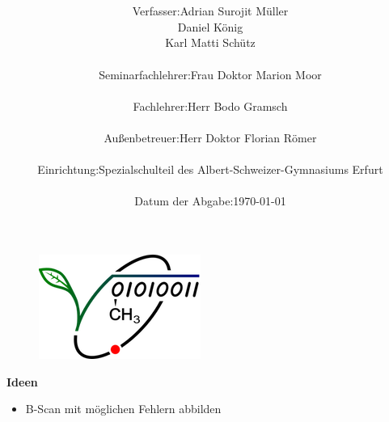 \documentclass[a4paper,10pt,ngerman]{scrartcl}
\title{\vspace{2cm}\textbf{\Huge\Titel}\vspace{2cm}}
\author{
    \centering
    \large
    \begin{tabular}{ll}
        Verfasser: & Adrian Surojit Müller \\
            & Daniel König \\
            & Karl Matti Schütz \\ \\
        Seminarfachlehrer: & Frau Doktor Marion Moor \\ \\
        Fachlehrer: & Herr Bodo Gramsch \\ \\
        Außenbetreuer: & Herr Doktor Florian Römer \\ \\
        Einrichtung: & Spezialschulteil des Albert-Schweizer-Gymnasiums Erfurt \\ \\
        Datum der Abgabe: & \today 
    \end{tabular}
}
\date{}
\begin{document}
\begin{figure}
  \centering
  \includegraphics[scale=3]{img/logo.png}
\end{figure}
\maketitle

\newpage
\tableofcontents

\newpage
\textbf{Ideen}
\begin{itemize}
  \item B-Scan mit möglichen Fehlern abbilden
\end{itemize}

\newpage
\end{document}
